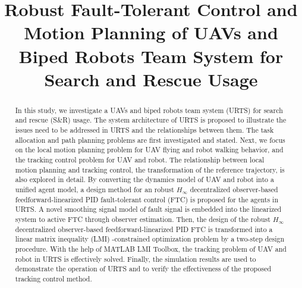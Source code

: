 \documentclass{ieeeaccess}
\begin{document}


\title{Robust Fault-Tolerant Control and Motion Planning of UAVs and Biped Robots Team System for Search and Rescue Usage}



\begin{abstract}
In this study, we investigate a UAVs and biped robots team system (URTS) for search and rescue (S\&R) usage. The system architecture of URTS is proposed to illustrate the issues need to be addressed in URTS and the relationships between them. The task allocation and path planning problems are first investigated and stated. Next, we focus on the local motion planning problem for UAV flying and robot walking behavior, and the tracking control problem for UAV and robot. The relationship between local motion planning and tracking control, the transformation of the reference trajectory, is also explored in detail. By converting the dynamics model of UAV and robot into a unified agent model, a design method for an robust $H_\infty$ decentralized observer-based feedforward-linearized PID fault-tolerant control (FTC) is proposed for the agents in URTS. A novel smoothing signal model of fault signal is embedded into the linearized system to active FTC through observer estimation. Then, the design of the robust $H_\infty$ decentralized observer-based feedforward-linearized PID FTC is transformed into a linear matrix inequality (LMI) -constrained optimization problem by a two-step design procedure. With the help of MATLAB LMI Toolbox, the tracking problem of UAV and robot in URTS is effectively solved. Finally, the simulation results are used to demonstrate the operation of URTS and to verify the effectiveness of the proposed tracking control method.
\end{abstract}
\end{document}
